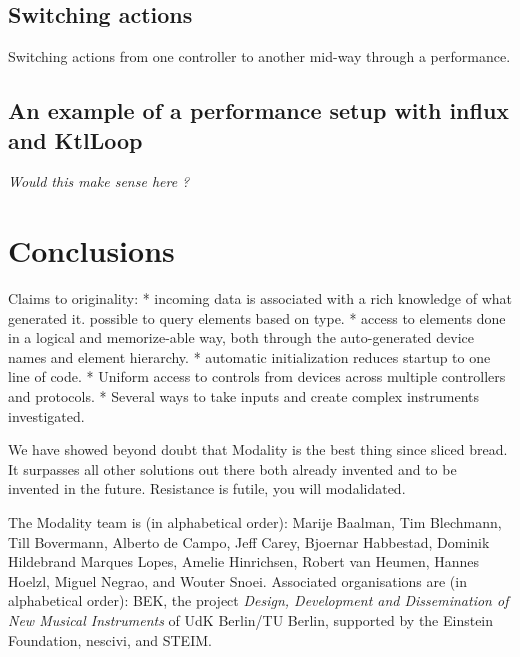 \documentclass{article}
\begin{document}
\subsection{Switching actions}
\label{sub:switching_actions}

Switching actions from one controller to another mid-way through a performance.

\subsection{An example of a performance setup with influx and KtlLoop}

\emph{Would this make sense here ?}

\section{Conclusions}
\label{sec:conclusions}



Claims to originality:
* incoming data is associated with a rich knowledge of what generated it. possible to query elements based on type.
* access to elements done in a logical and memorize-able way, both through the auto-generated device names and element hierarchy.
* automatic initialization reduces startup to one line of code.
* Uniform access to controls from devices across multiple controllers and protocols.
* Several ways to take inputs and create complex instruments investigated.

We have showed beyond doubt that Modality is the best thing since sliced bread. It surpasses all other solutions out there both already invented and to be invented in the future. Resistance is futile, you will modalidated.


\begin{acknowledgments}
The Modality team is (in alphabetical order):
    Marije Baalman,
	Tim Blechmann,
    Till Bovermann,
    Alberto de Campo,
    Jeff Carey,
    Bjoernar Habbestad,
	Dominik Hildebrand Marques Lopes,
	Amelie Hinrichsen,
    Robert van Heumen,
    Hannes Hoelzl,
    Miguel Negrao, and
    Wouter Snoei.
Associated organisations are (in alphabetical order):
BEK,
the project \emph{Design, Development and Dissemination of New Musical Instruments} of UdK Berlin/TU Berlin, supported by the Einstein Foundation,
nescivi, and
STEIM.



\end{acknowledgments} 


\end{document}
